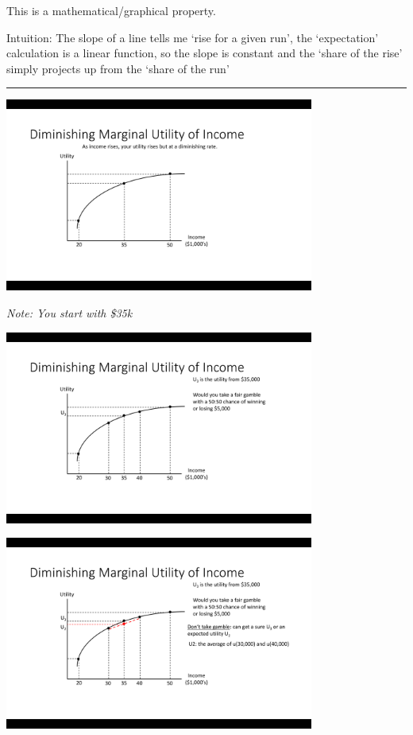 \documentclass[]{article}
\begin{document}
This is a mathematical/graphical property.

Intuition: The slope of a line tells me `rise for a given run', the
`expectation' calculation is a linear function, so the slope is constant
and the `share of the rise' simply projects up from the `share of the
run'

\begin{center}\rule{0.5\linewidth}{\linethickness}\end{center}

\includegraphics[height=2.5in]{picsfigs/riskaversion1.png}

\emph{Note: You start with \$35k}

\includegraphics[height=2.5in]{picsfigs/riskaversion2.png}

\includegraphics[height=2.5in]{picsfigs/riskaversion3.png}
\end{document}
